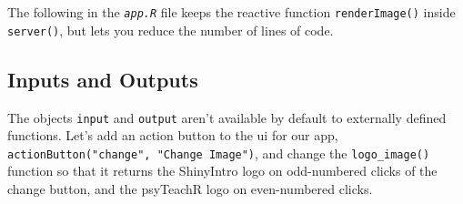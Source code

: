 \documentclass[
  oneside]{book}
\newenvironment{Shaded}{\begin{snugshade}}{\end{snugshade}}
\newcommand{\AttributeTok}[1]{\textcolor[rgb]{0.77,0.63,0.00}{#1}}
\newcommand{\ConstantTok}[1]{\textcolor[rgb]{0.00,0.00,0.00}{#1}}
\newcommand{\ControlFlowTok}[1]{\textcolor[rgb]{0.13,0.29,0.53}{\textbf{#1}}}
\newcommand{\DecValTok}[1]{\textcolor[rgb]{0.00,0.00,0.81}{#1}}
\newcommand{\FunctionTok}[1]{\textcolor[rgb]{0.00,0.00,0.00}{#1}}
\newcommand{\NormalTok}[1]{#1}
\newcommand{\OtherTok}[1]{\textcolor[rgb]{0.56,0.35,0.01}{#1}}
\newcommand{\SpecialCharTok}[1]{\textcolor[rgb]{0.00,0.00,0.00}{#1}}
\newcommand{\StringTok}[1]{\textcolor[rgb]{0.31,0.60,0.02}{#1}}
\begin{document}
The following in the \textit{\texttt{app.R}} file keeps the reactive function \texttt{renderImage}\texttt{()} inside \texttt{server}\texttt{()}, but lets you reduce the number of lines of code.

\begin{Shaded}
\end{Shaded}

\hypertarget{inputs-and-outputs}{%
\subsection{Inputs and Outputs}\label{inputs-and-outputs}}

The objects \texttt{input} and \texttt{output} aren't available by default to externally defined functions. Let's add an action button to the ui for our app, \texttt{actionButton("change",\ "Change\ Image")}, and change the \texttt{logo\_image}\texttt{()} function so that it returns the ShinyIntro logo on odd-numbered clicks of the change button, and the psyTeachR logo on even-numbered clicks.

\begin{Shaded}
\end{Shaded}
\end{document}
